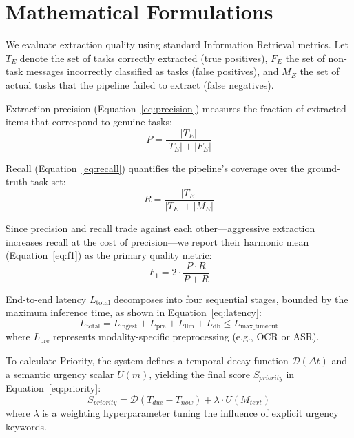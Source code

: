 \section{Mathematical Formulations}
\label{sec:mathematical_formulations}

We evaluate extraction quality using standard Information Retrieval metrics. Let $T_{E}$ denote the set of tasks correctly extracted (true positives), $F_{E}$ the set of non-task messages incorrectly classified as tasks (false positives), and $M_{E}$ the set of actual tasks that the pipeline failed to extract (false negatives).

Extraction precision (Equation~\ref{eq:precision}) measures the fraction of extracted items that correspond to genuine tasks:
\begin{equation}
\label{eq:precision}
P = \frac{|T_{E}|}{|T_{E}| + |F_{E}|}
\end{equation}

Recall (Equation~\ref{eq:recall}) quantifies the pipeline's coverage over the ground-truth task set:
\begin{equation}
\label{eq:recall}
R = \frac{|T_{E}|}{|T_{E}| + |M_{E}|}
\end{equation}

Since precision and recall trade against each other—aggressive extraction increases recall at the cost of precision—we report their harmonic mean (Equation~\ref{eq:f1}) as the primary quality metric:
\begin{equation}
\label{eq:f1}
F_1 = 2 \cdot \frac{P \cdot R}{P + R}
\end{equation}

End-to-end latency $L_{\text{total}}$ decomposes into four sequential stages, bounded by the maximum inference time, as shown in Equation~\ref{eq:latency}:
\begin{equation}
\label{eq:latency}
L_{\text{total}} = L_{\text{ingest}} + L_{\text{pre}} + L_{\text{llm}} + L_{\text{db}} \le L_{\text{max\_timeout}}
\end{equation}
where $L_{\text{pre}}$ represents modality-specific preprocessing (e.g., OCR or ASR).

To calculate Priority, the system defines a temporal decay function $\mathcal{D}(\Delta t)$ and a semantic urgency scalar $U(m)$, yielding the final score $S_{priority}$ in Equation~\ref{eq:priority}:
\begin{equation}
\label{eq:priority}
S_{priority} = \mathcal{D}(T_{due} - T_{now}) + \lambda \cdot U(M_{text})
\end{equation}
where $\lambda$ is a weighting hyperparameter tuning the influence of explicit urgency keywords.
